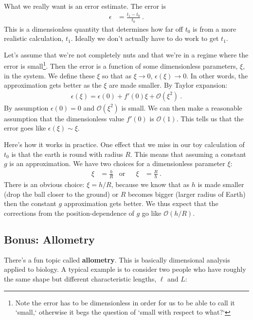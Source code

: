What we really want is an error estimate. The error is
\begin{align}
  \epsilon &= \frac{t_1 - t_0}{t_0} \ .
\end{align}
This is a dimensionless quantity that determines how far off $t_0$ is from a more realistic calculation, $t_1$. Ideally we don’t actually have to do work to get $t_1$. 

Let’s assume that we’re not completely nuts and that we’re in a regime where the error is small\footnote{Note the error has to be dimensionless in order for us to be able to call it `small,` otherwise it begs the question of `small with respect to what?`}. Then the error is a function of some dimensionless parameters, $\xi$, in the system. We define these $\xi$ so that as $\xi \to 0$, $\epsilon(\xi) \to 0$. In other words, the approximation gets better as the $\xi$ are made smaller. By Taylor expansion:
\begin{align}
  \epsilon(\xi) = \epsilon(0) + f'(0) \xi + \mathcal O(\xi^2) \ .
\end{align}
By assumption  $\epsilon(0) = 0$ and $\mathcal O(\xi^2)$ is  small. We can then make a reasonable assumption that the dimensionless value $f'(0)$  is $\mathcal O(1)$. This tells us that the error goes like $\epsilon(\xi) \sim \xi$.

Here’s how it works in practice. One effect that we miss in our toy calculation of $t_0$ is that the earth is round with radius $R$. This means that assuming a constant $g$ is an approximation. We have two choices for a dimensionless parameter $\xi$:
\begin{align}
  \xi &= \frac{h}{R}
  &\text{or}&&
  \xi &= \frac{R}{h} \ .
\end{align}
There is an obvious choice: $\xi = h/R$, because we know that as $h$ is made smaller (drop the ball closer to the ground) or $R$ becomes bigger (larger radius of Earth) then the constant $g$ approximation gets better. We thus expect that the corrections from the position-dependence of $g$ go like $\mathcal O(h/R)$.
 


\subsection{Bonus: Allometry}

There’s a fun topic called \textbf{allometry}. This is basically dimensional analysis applied to biology. A typical example is to consider two people who have roughly the same shape but different characteristic lengths, $\ell$ and $L$:


